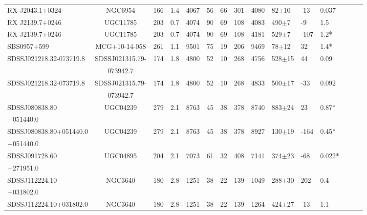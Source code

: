 \begin{landscape}
\begin{center}
\begin{longtable}{l c l l l l l l l l l l l l l}
RX J2043.1+0324  			&  NGC6954  					&  166  & 1.4 &  4067  	&  56  &  66  	&  301  &  4080  	&  82$\pm$10  		&  -13  	&  0.037  \\
RX J2139.7+0246  			&  UGC11785  					&  203  & 0.7 &  4074  	&  90  &  69  	&  108  &  4083  	&  490$\pm$7  		&  -9  	&  1.5  \\
RX J2139.7+0246  			&  UGC11785  					&  203  & 0.7 &  4074  	&  90  &  69  	&  108  &  4181  	&  529$\pm$7  		&  -107  	&  1.2*  \\
SBS0957+599  			&  MCG+10-14-058  				&  261  & 1.1 &  9501  	&  75  &  19  	&  206  &  9469  	&  78$\pm$12  		&  32  	&  1.4*  \\
SDSSJ021218.32-073719.8  	&  SDSSJ021315.79-			&  174  & 1.8 &  4800  	&  52  &  10  	&  268  &  4756  	&  528$\pm$15  	&  44  	&  0.09  \\
					  	& 			073942.7  		& 	    &	     &		  	&  	  &  	  	&	    &  		  	&  			  	&  	  	&  	  \\
SDSSJ021218.32-073719.8  	&  SDSSJ021315.79-		 	&  174  & 1.8 &  4800  	&  52  &  10  	&  268  &  4833  	&  500$\pm$17  	&  -33  	&  0.092  \\
					  	& 			073942.7  		& 	    &	     &		  	&  	  &  	  	&	    &  		  	&  			  	&  	  	&  	  \\
SDSSJ080838.80		  	&  UGC04239  					&  279  & 2.1 &  8763  	&  45  &  38  	&  378  &  8740  	&  883$\pm$24  	&  23  	&  0.87*  \\
		+051440.0	  	& 					  		& 	    &	     &		  	&  	  &  	  	&	    &  		  	&  			  	&  	  	&  	  \\
SDSSJ080838.80+051440.0  	&  UGC04239  					&  279  & 2.1 &  8763  	&  45  &  38  	&  378  &  8927  	&  130$\pm$19  	&  -164  	&  0.45*  \\
		+051440.0	  	& 					  		& 	    &	     &		  	&  	  &  	  	&	    &  		  	&  			  	&  	  	&  	  \\
SDSSJ091728.60		  	&  UGC04895  					&  204  & 2.1 &  7073  	&  61  &  32  	&  408  &  7141  	&  374$\pm$23  	&  -68  	&  0.022*  \\
		+271951.0	  	& 					  		& 	    &	     &		  	&  	  &  	  	&	    &  		  	&  			  	&  	  	&  	  \\
SDSSJ112224.10		  	&  NGC3640  					&  180  & 2.8 &  1251  	&  38  &  22  	&  139  &  1049  	&  288$\pm$30  	&  202  	&  0.4  \\
		+031802.0	  	& 					  		& 	    &	     &		  	&  	  &  	  	&	    &  		  	&  			  	&  	  	&  	  \\
SDSSJ112224.10+031802.0  	&  NGC3640  					&  180  & 2.8 &  1251  	&  38  &  22  	&  139  &  1264  	&  424$\pm$27  	&  -13  	&  1.1  \\

\end{longtable}
\end{center}
\end{landscape}
